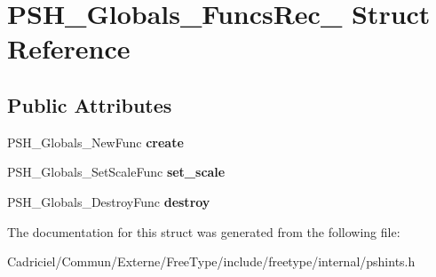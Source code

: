 \hypertarget{struct_p_s_h___globals___funcs_rec__}{\section{P\-S\-H\-\_\-\-Globals\-\_\-\-Funcs\-Rec\-\_\- Struct Reference}
\label{struct_p_s_h___globals___funcs_rec__}
}
\subsection*{Public Attributes}
\begin{DoxyCompactItemize}
\item 
\hypertarget{struct_p_s_h___globals___funcs_rec___ac136cec55ea33a2e3b60ffdad20f5420}{P\-S\-H\-\_\-\-Globals\-\_\-\-New\-Func {\bfseries create}}\label{struct_p_s_h___globals___funcs_rec___ac136cec55ea33a2e3b60ffdad20f5420}

\item 
\hypertarget{struct_p_s_h___globals___funcs_rec___a9c97456d3f521cb1091f08c2bda27332}{P\-S\-H\-\_\-\-Globals\-\_\-\-Set\-Scale\-Func {\bfseries set\-\_\-scale}}\label{struct_p_s_h___globals___funcs_rec___a9c97456d3f521cb1091f08c2bda27332}

\item 
\hypertarget{struct_p_s_h___globals___funcs_rec___aebb5534f8305a189b09adfebff4f57ba}{P\-S\-H\-\_\-\-Globals\-\_\-\-Destroy\-Func {\bfseries destroy}}\label{struct_p_s_h___globals___funcs_rec___aebb5534f8305a189b09adfebff4f57ba}

\end{DoxyCompactItemize}


The documentation for this struct was generated from the following file\-:\begin{DoxyCompactItemize}
\item 
Cadriciel/\-Commun/\-Externe/\-Free\-Type/include/freetype/internal/pshints.\-h\end{DoxyCompactItemize}
